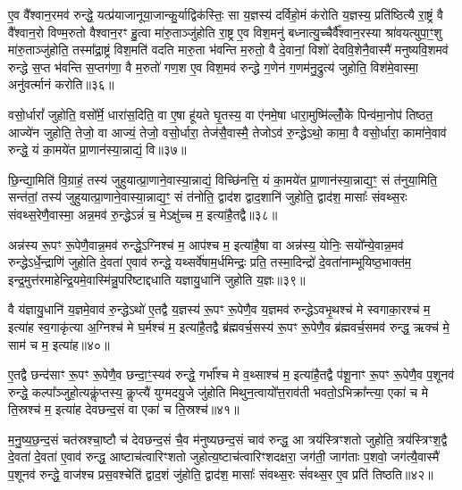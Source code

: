 ए॒व वै᳚श्वान॒रमव॑ रुन्द्धे॒ यत्प्र॑याजानूया॒जान्कु॒र्याद्विक॑स्तिः॒ सा य॒ज्ञस्य॑ दर्विहो॒मं क॑रोति य॒ज्ञस्य॒ प्रति॑ष्ठित्यै रा॒ष्ट्रं वै वै᳚श्वान॒रो विण्म॒रुतो वैश्वान॒रꣳ हु॒त्वा मा॑रु॒ताञ्जु॑होति रा॒ष्ट्र ए॒व विश॒मनु॑ बध्नात्यु॒च्चैर्वै᳚श्वान॒रस्या श्रा॑वयत्युपा॒ꣳ॒शु मा॑रु॒ताञ्जु॑होति॒ तस्मा᳚द्रा॒ष्ट्रं विश॒मति॑ वदति मारु॒ता भ॑वन्ति म॒रुतो॒ वै दे॒वानां॒ विशो॑ देववि॒शेनै॒वास्मै॑ मनुष्यवि॒शमव॑ रुन्द्धे स॒प्त भ॑वन्ति स॒प्तग॑णा॒ वै म॒रुतो॑ गण॒श ए॒व विश॒मव॑ रुन्द्धे ग॒णेन॑ ग॒णम॑नु॒द्रुत्य॑ जुहोति॒ विश॑मे॒वास्मा॒ अनु॑वर्त्मानं करोति॥३६॥

{\anuvakamend[{अग्ने॒ प्रेह्यव॑ स्म दुहे॒ तां प्र॒जाप॑तेः सा॒क्षान्म॑नुष्यवि॒शमेक॑विꣳशतिश्च॥७॥}]}

वसो॒र्धारां᳚ जुहोति॒ वसो᳚र्मे॒ धारा॑स॒दिति॒ वा ए॒षा हू॑यते घृ॒तस्य॒ वा ए॑नमे॒षा धारा॒मुष्मि॑ल्लोँ॒के पिन्व॑मा॒नोप॑ तिष्ठत॒ आज्ये॑न जुहोति॒ तेजो॒ वा आज्यं॒ तेजो॒ वसो॒र्धारा॒ तेज॑सै॒वास्मै॒ तेजो\-ऽव॑ रु॒न्द्धे\-ऽथो॒ कामा॒ वै वसो॒र्धारा॒ कामा॑ने॒वाव॑ रुन्द्धे॒ यं का॒मये॑त प्रा॒णान॑स्या॒न्नाद्यं॒ वि॥३७॥

छि॒न्द्या॒मिति॑ वि॒ग्राहं॒ तस्य॑ जुहुयात्प्रा॒णाने॒वास्या॒न्नाद्यं॒ विच्छि॑नत्ति॒ यं का॒मये॑त प्रा॒णान॑स्या॒न्नाद्य॒ꣳ॒ सं त॑नुया॒मिति॒ सन्त॑तां॒ तस्य॑ जुहुयात्प्रा॒णाने॒वास्या॒न्नाद्य॒ꣳ॒ सं त॑नोति॒ द्वाद॑श द्वाद॒शानि॑ जुहोति॒ द्वाद॑श॒ मासाः᳚ संवथ्स॒रः संवथ्स॒रेणै॒वास्मा॒ अन्न॒मव॑ रु॒न्द्धे\-ऽन्नं॑ च॒ मे\-ऽक्षु॑च्च म॒ इत्या॑है॒तद्वै॥३८॥

अन्न॑स्य रू॒पꣳ रू॒पेणै॒वान्न॒मव॑ रुन्द्धे॒\-ऽग्निश्च॑ म॒ आप॑श्च म॒ इत्या॑है॒षा वा अन्न॑स्य॒ योनिः॒ सयो᳚न्ये॒वान्न॒मव॑ रुन्द्धे\-ऽर्धे॒न्द्राणि॑ जुहोति दे॒वता॑ ए॒वाव॑ रुन्द्धे॒ यथ्सर्वे॑षाम॒र्धमिन्द्रः॒ प्रति॒ तस्मा॒दिन्द्रो॑ दे॒वता॑नाम्भूयिष्ठ॒भाक्त॑म॒ इन्द्र॒मुत्त॑रमाहेन्द्रि॒यमे॒वास्मि॑न्नु॒परि॑ष्टाद्दधाति यज्ञायु॒धानि॑ जुहोति य॒ज्ञः॥३९॥

वै य॑ज्ञायु॒धानि॑ य॒ज्ञमे॒वाव॑ रु॒न्द्धे\-ऽथो॑ ए॒तद्वै य॒ज्ञस्य॑ रू॒पꣳ रू॒पेणै॒व य॒ज्ञमव॑ रुन्द्धे\-ऽवभृ॒थश्च॑ मे स्वगाका॒रश्च॑ म॒ इत्या॑ह स्व॒गाकृ॑त्या अ॒ग्निश्च॑ मे घ॒र्मश्च॑ म॒ इत्या॑है॒तद्वै ब्र॑ह्मवर्च॒सस्य॑ रू॒पꣳ रू॒पेणै॒व ब्र॑ह्मवर्च॒समव॑ रुन्द्ध॒ ऋक्च॑ मे॒ साम॑ च म॒ इत्या॑ह॥४०॥

ए॒तद्वै छन्द॑साꣳ रू॒पꣳ रू॒पेणै॒व छन्दा॒ꣳ॒स्यव॑ रुन्द्धे॒ गर्भा᳚श्च मे व॒थ्साश्च॑ म॒ इत्या॑है॒तद्वै प॑शू॒नाꣳ रू॒पꣳ रू॒पेणै॒व प॒शूनव॑ रुन्द्धे॒ कल्पा᳚ञ्जुहो॒त्यकॢ॑प्तस्य॒ कॢप्त्यै॑ युग्मदयु॒जे जु॑होति मिथुन॒त्वायो᳚त्त॒राव॑ती भवतो॒\-ऽभिक्रा᳚न्त्या॒ एका॑ च मे ति॒स्रश्च॑ म॒ इत्या॑ह देवछन्द॒सं वा एका॑ च ति॒स्रश्च॑॥४१॥

म॒नु॒ष्य॒छ॒न्द॒सं चत॑स्रश्चा॒ष्टौ च॑ देवछन्द॒सं चै॒व म॑नुष्यछन्द॒सं चाव॑ रुन्द्ध॒ आ त्रय॑स्त्रिꣳशतो जुहोति॒ त्रय॑स्त्रिꣳश॒द्वै दे॒वता॑ दे॒वता॑ ए॒वाव॑ रुन्द्ध॒ आष्टाच॑त्वारिꣳशतो जुहोत्य॒ष्टाच॑त्वारिꣳशदक्षरा॒ जग॑ती॒ जाग॑ताः प॒शवो॒ जग॑त्यै॒वास्मै॑ प॒शूनव॑ रुन्द्धे॒ वाज॑श्च प्रस॒वश्चेति॑ द्वाद॒शं जु॑होति॒ द्वाद॑श॒ मासाः᳚ संवथ्स॒रः सं॑वथ्स॒र ए॒व प्रति॑ तिष्ठति॥४२॥

